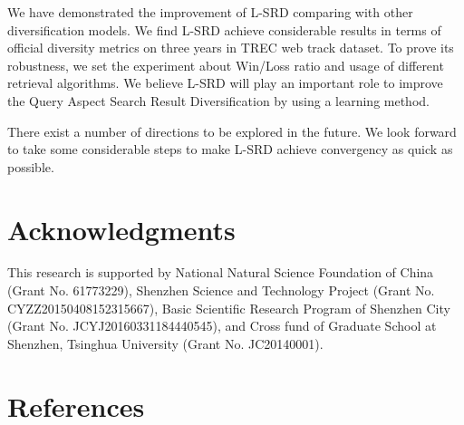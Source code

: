 \documentclass[review]{elsarticle}
\begin{document}
We have demonstrated the improvement of L-SRD comparing with other diversification models. We find L-SRD achieve considerable results in terms of official diversity metrics on three years in TREC web track dataset. To prove its robustness, we set the experiment about Win/Loss ratio and usage of different retrieval algorithms. We believe L-SRD will play an important role to improve the Query Aspect Search Result Diversification by using a learning method.

There exist a number of directions to be explored in the future. We look forward to take some considerable steps to make L-SRD achieve convergency as quick as possible. %

\section{Acknowledgments}


This research is supported by National Natural Science Foundation of China (Grant No. 61773229), Shenzhen Science and Technology Project (Grant No. CYZZ20150408152315667), Basic Scientific Research Program of Shenzhen City (Grant No. JCYJ20160331184440545), and Cross fund of Graduate School at Shenzhen, Tsinghua University (Grant No. JC20140001).


\section*{References}
%

\end{document}

